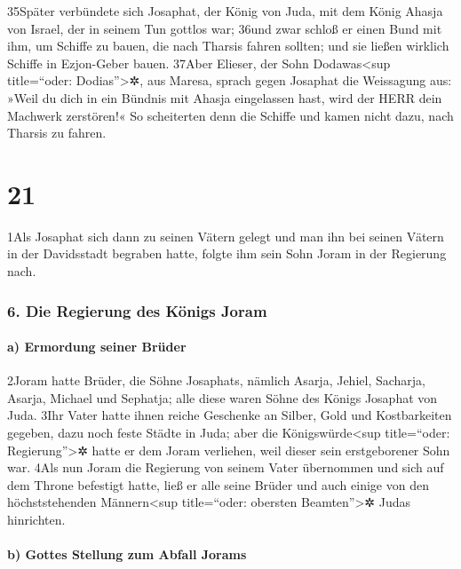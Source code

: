 35Später verbündete sich Josaphat, der König von Juda, mit dem König
Ahasja von Israel, der in seinem Tun gottlos war; 36und zwar schloß er
einen Bund mit ihm, um Schiffe zu bauen, die nach Tharsis fahren
sollten; und sie ließen wirklich Schiffe in Ezjon-Geber bauen. 37Aber
Elieser, der Sohn Dodawas\textless sup title=``oder:
Dodias''\textgreater✲, aus Maresa, sprach gegen Josaphat die Weissagung
aus: »Weil du dich in ein Bündnis mit Ahasja eingelassen hast, wird der
HERR dein Machwerk zerstören!« So scheiterten denn die Schiffe und kamen
nicht dazu, nach Tharsis zu fahren.

\hypertarget{section-20}{%
\section{21}\label{section-20}}

1Als Josaphat sich dann zu seinen Vätern gelegt und man ihn bei seinen
Vätern in der Davidsstadt begraben hatte, folgte ihm sein Sohn Joram in
der Regierung nach.

\hypertarget{die-regierung-des-kuxf6nigs-joram}{%
\subsubsection{6. Die Regierung des Königs
Joram}\label{die-regierung-des-kuxf6nigs-joram}}

\hypertarget{a-ermordung-seiner-bruxfcder}{%
\paragraph{a) Ermordung seiner
Brüder}\label{a-ermordung-seiner-bruxfcder}}

2Joram hatte Brüder, die Söhne Josaphats, nämlich Asarja, Jehiel,
Sacharja, Asarja, Michael und Sephatja; alle diese waren Söhne des
Königs Josaphat von Juda. 3Ihr Vater hatte ihnen reiche Geschenke an
Silber, Gold und Kostbarkeiten gegeben, dazu noch feste Städte in Juda;
aber die Königswürde\textless sup title=``oder: Regierung''\textgreater✲
hatte er dem Joram verliehen, weil dieser sein erstgeborener Sohn war.
4Als nun Joram die Regierung von seinem Vater übernommen und sich auf
dem Throne befestigt hatte, ließ er alle seine Brüder und auch einige
von den höchststehenden Männern\textless sup title=``oder: obersten
Beamten''\textgreater✲ Judas hinrichten.

\hypertarget{b-gottes-stellung-zum-abfall-jorams}{%
\paragraph{b) Gottes Stellung zum Abfall
Jorams}\label{b-gottes-stellung-zum-abfall-jorams}}

